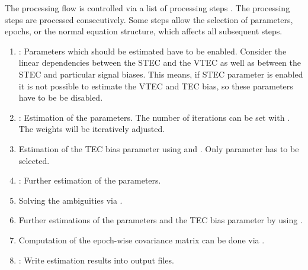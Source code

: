 The processing flow is controlled via a list of processing steps . The processing steps are
processed consecutively. Some steps allow the selection of parameters,
epochs, or the normal equation structure, which affects all subsequent steps.

\begin{enumerate}
    \item {}:  Parameters which should be estimated have to be enabled.
    Consider the linear dependencies between the STEC and the VTEC as well as between the STEC and particular signal biases. This means, if STEC parameter
    is enabled it is not possible to estimate the VTEC and TEC bias, so these parameters have to be be disabled.
    \item {}: Estimation of the parameters. The number of iterations can be set with
    . The weights will be iteratively adjusted.
    \item Estimation of the TEC bias parameter using  and
    . Only  parameter has to be selected.
    \item {}: Further estimation of the parameters.
    \item Solving the ambiguities via .
    \item Further estimations of the parameters and the TEC bias parameter by using .
    \item Computation of the epoch-wise covariance matrix can be done via .
    \item {}: Write estimation results into output files.
\end{enumerate}




